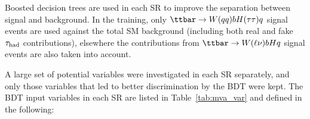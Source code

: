Boosted decision trees are used in each SR to improve the separation between signal and background. 
In the training, only $\ttbar \to W(qq)bH(\tau\tau)q$ signal events are used against the total SM background (including both real and fake $\tau_{\mathrm{had}}$ contributions), 
elsewhere the contributions from $\ttbar \to W(\ell\nu)bHq$ signal events are also taken into account. 

A large set of potential variables were investigated in each SR separately, and only those variables that led to better discrimination
by the BDT were kept.  The BDT input variables in each SR are listed in Table~\ref{tab:mva_var} and defined in the following:

